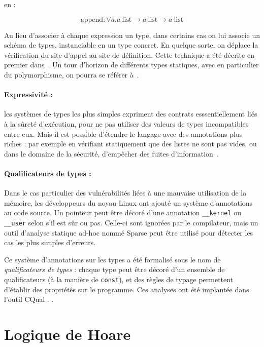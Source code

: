 en :

\[ \textrm{append} : ∀ a.
   a~\textrm{list} → a~\textrm{list} → a~\textrm{list}
\]

Au lieu d'associer à chaque expression un type, dans certains cas on lui associe
un schéma de types, instanciable en un type concret. En quelque sorte, on
déplace la vérification du site d'appel au site de définition. Cette technique a
été décrite en premier dans~\cite{Milner78}.
Un tour d'horizon de différents types statiques, avec en particulier du
polymorphisme, on pourra se référer à~\cite{TAPL}.

\paragraph{Expressivité :} les systèmes de types les plus simples expriment des
contrats esssentiellement liés à la sûreté d'exécution, pour ne pas utiliser des
valeurs de types incompatibles entre eux. Mais il est possible d'étendre le
langage avec des annotations plus riches : par exemple en vérifiant statiquement
que des listes ne sont pas vides\cite{lightweight-static-capabilities}, ou dans
le domaine de la sécurité, d'empêcher des fuites d'information~\cite{LZ06a}.

\paragraph{Qualificateurs de types :} Dans le cas particulier des vulnérabilités
liées à une mauvaise utilisation de la mémoire, les développeurs du noyau Linux
ont ajouté un système d'annotations au code source. Un pointeur peut être décoré
d'une annotation \texttt{\_\_kernel} ou \texttt{\_\_user} selon s'il est sûr ou
pas. Celle-ci sont ignorées par le compilateur, mais un outil d'analyse statique
ad-hoc nommé Sparse  peut être utilisé pour détecter les cas les
plus simples d'erreurs.

Ce système d'annotations sur les types a été formalisé sous le nom de
\emph{qualificateurs de types} : chaque type peut être décoré d'un ensemble de
qualificateurs (à la manière de \texttt{const}), et des règles de typage
permettent d'établir des propriétés sur le programme. Ces analyses ont été
implantée dans l'outil CQual
\cite{pldi99,usenix01,pldi02,cquk-usenix04,toplas-quals}. .


\section{Logique de Hoare}


